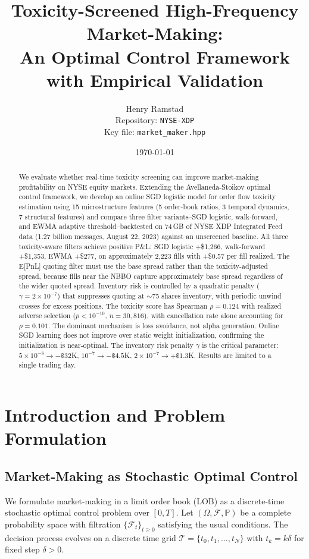 \documentclass[11pt]{article}
\title{Toxicity-Screened High-Frequency Market-Making: \\An Optimal Control Framework with Empirical Validation}
\author{Henry Ramstad \\
 Repository: \texttt{NYSE-XDP} \\
 Key file: \texttt{market\_maker.hpp}}
\date{\today}
\theoremstyle{definition}
\begin{document}
\maketitle

\begin{abstract}
\noindent
We evaluate whether real-time toxicity screening can improve market-making profitability on NYSE equity markets. Extending the Avellaneda-Stoikov optimal control framework, we develop an online SGD logistic model for order flow toxicity estimation using 15 microstructure features (5 order-book ratios, 3 temporal dynamics, 7 structural features) and compare three filter variants--SGD logistic, walk-forward, and EWMA adaptive threshold--backtested on 74\,GB of NYSE XDP Integrated Feed data (1.27 billion messages, August 22, 2023) against an unscreened baseline.
All three toxicity-aware filters achieve positive P\&L: SGD logistic +\$1,266, walk-forward +\$1,353, EWMA +\$277, on approximately 2,223 fills with +\$0.57 per fill realized. The E[PnL] quoting filter must use the base spread rather than the toxicity-adjusted spread, because fills near the NBBO capture approximately base spread regardless of the wider quoted spread. Inventory risk is controlled by a quadratic penalty ($\gamma = 2 \times 10^{-7}$) that suppresses quoting at $\sim$75 shares inventory, with periodic unwind crosses for excess positions. The toxicity score has Spearman $\rho = 0.124$ with realized adverse selection ($p < 10^{-10}$, $n = 30{,}816$), with cancellation rate alone accounting for $\rho = 0.101$.
The dominant mechanism is loss avoidance, not alpha generation. Online SGD learning does not improve over static weight initialization, confirming the initialization is near-optimal. The inventory risk penalty $\gamma$ is the critical parameter: $5 \times 10^{-8} \rightarrow -\$32$K, $10^{-7} \rightarrow -\$4.5$K, $2 \times 10^{-7} \rightarrow +\$1.3$K. Results are limited to a single trading day.
\end{abstract}

\section{Introduction and Problem Formulation}

\subsection{Market-Making as Stochastic Optimal Control}

We formulate market-making in a limit order book (LOB) as a discrete-time stochastic optimal control problem over $[0,T]$. Let $(\Omega, \mathcal{F}, \mathbb{P})$ be a complete probability space with filtration $\{\mathcal{F}_t\}_{t \geq 0}$ satisfying the usual conditions. The decision process evolves on a discrete time grid $\mathcal{T} = \{t_0, t_1, \ldots, t_N\}$ with $t_k = k \delta$ for fixed step $\delta > 0$.
\end{document}
